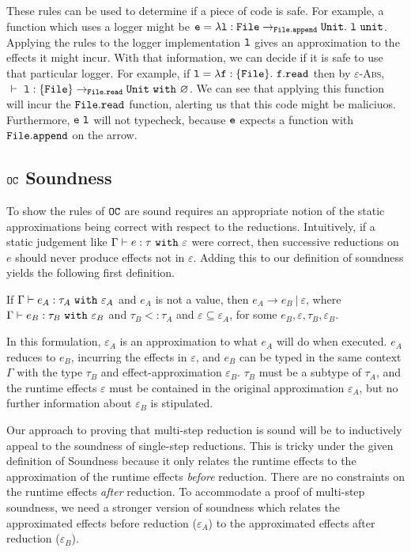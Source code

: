 These rules can be used to determine if a piece of code is safe. For example, a function which uses a logger might be $\mathtt{e = \lambda l: File \rightarrow_{\mathtt{File.append}} Unit.~l~unit}$. Applying the rules to the logger implementation $\mathtt{l}$ gives an approximation to the effects it might incur. With that information, we can decide if it is safe to use that particular logger. For example, if $\mathtt{l = \lambda f: \{ File \}.~f.read}$ then by \textsc{$\varepsilon$-Abs}, $~\vdash~\mathtt{l}: \mathtt{ \{ File \} \rightarrow_{\mathtt{File.read}} Unit}~ \mathtt{with}~ \varnothing$. We can see that applying this function will incur the $\mathtt{File.read}$ function, alerting us that this code might be maliciuos. Furthermore, $\mathtt{e~l}$ will not typecheck, because $\mathtt{e}$ expects a function with $\mathtt{File.append}$ on the arrow.


\subsection{$\mathtt{OC}$ Soundness}

To show the rules of $\mathtt{OC}$ are sound requires an appropriate notion of the static approximations being correct with respect to the reductions. Intuitively, if a static judgement like $\Gamma \vdash e: \tau~\mathtt{with}~ \varepsilon$ were correct, then successive reductions on $e$ should never produce effects not in $\varepsilon$. Adding this to our definition of soundness yields the following first definition.

\begin{theorem}
If $ \Gamma \vdash  e_A:  \tau_A~\mathtt{with}~ \varepsilon_A$ and $ e_A$ is not a value, then $e_A \longrightarrow e_B~|~\varepsilon$, where $ \Gamma \vdash e_B:  \tau_B~\mathtt{with}~ \varepsilon_B$ and $ \tau_B <:  \tau_A$ and $\varepsilon \subseteq \varepsilon_A$, for some $e_B, \varepsilon, \tau_B, \varepsilon_B$.
\end{theorem}

In this formulation, $\varepsilon_A$ is an approximation to what $e_A$ will do when executed. $e_A$ reduces to $e_B$, incurring the effects in $\varepsilon$, and $e_B$ can be typed in the same context $\Gamma$ with the type $\tau_B$ and effect-approximation $\varepsilon_B$. $\tau_B$ must be a subtype of $\tau_A$, and the runtime effects $\varepsilon$ must be contained in the original approximation $\varepsilon_A$, but no further information about $\varepsilon_B$ is stipulated.

Our approach to proving that multi-step reduction is sound will be to inductively appeal to the soundness of single-step reductions. This is tricky under the given definition of Soundness because it only relates the runtime effects to the approximation of the runtime effects \textit{before} reduction. There are no constraints on the runtime effects \textit{after} reduction. To accommodate a proof of multi-step soundness, we need a stronger version of soundness which relates the approximated effects before reduction ($\varepsilon_A$) to the approximated effects after reduction ($\varepsilon_B$).

